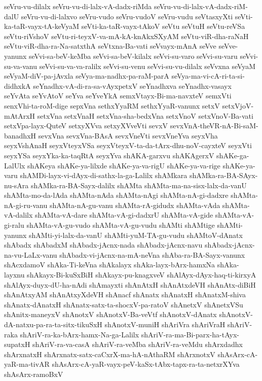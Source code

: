 {seVru-vu-dilalx
seVru-vu-di-lalx-vA-dadx-riMda
seVru-vu-di-lalx-vA-dadx-riM-dalU
seVru-vu-di-lalxvo
seVru-vudo
seVru-vudoV
seVru-vudu
seVtasxyXti
seVti-ka-taR-vayx-tA-keVyaM
seVti-ka-taR-vayx-tAkoV
seVtu
seVtuH
seVtu-reVSa
seVtu-riVshoV
seVtu-ri-teyxV-va-mA-kA-knAkxSXyAM
seVtu-viR-dha-raNaH
seVtu-viR-dha-ra-Na-satxthA
seVtxna-Ba-vati
seVvayx-mAnA
seVve
seVve-yanunx
seVvi-sa-beV-keMba
seVvi-sa-beV-kilalx
seVvi-su-varo
seVvi-su-varu
seVvi-su-va-vanu
seVvi-su-va-va-ralilx
seVvi-su-venu
seVvi-su-vu-dilalx
seVvxna
seVyaM
seVyaM-diV-pa-jAvxla
seVya-ma-nadhx-pa-raM-parA
seVya-ma-vi-cA-ri-ta-si-didhxkA
seYnadhx-vA-di-ra-sa-vAyxpetxV
seYnadhxva
seYnadhx-vasayx
seYvAta
seYvAtoV
seYva
seYveYkA
semxVtayx-Bi-ma-navxteV
semxVti
senxVhi-ta-roM-dige
sepxVna
sethxYyaRM
sethxYyaR-vanunx
setxV
setxVjoV-mAtArxH
setxVna
setxVnaH
setxVna-sha-bedxVna
setxVnoV
setxVnoV-Ba-vati
setxVpa-layx-QuteV
setxyXVva
setxyXVveVti
sevxV
sevxVnA-theVR-nA-Bi-saM-banadhxH
sevxVna
sevxVna-BAsA
sevxVneVti
sevxVneYva
seyxVha
seyxVshAnaH
seyxVteyxVSa
seyxVteyxV-ta-da-tArx-dhu-noV-cayxteV
seyxVti
seyxYSa
seyxYka-ka-taqRtA
seyxYva
shAKA-garxvu
shAKAgerxV
shAKe-ga-LalUlx
shAKeya
shAKe-ya-lilxde
shAKe-ya-va-rigU
shAKe-ya-va-rige
shAKe-ya-varu
shAMDi-layx-vi-dAyx-di-sathx-la-ga-Lalilx
shAMkara
shAMka-ra-BA-SAyx-nu-sAra
shAMka-ra-BA-Sayx-dalilx
shAMta
shAMta-ma-na-sisx-lalx-da-vanU
shAMta-mo-da-lAda
shAMta-nAda
shAMta-nAgi
shAMta-nA-gi-dadxre
shAMta-nA-gi-ru-vanu
shAMta-nA-gu-vanu
shAMta-rA-gidudx
shAMta-vAda
shAMta-vA-dalilx
shAMta-vA-dare
shAMta-vA-gi-dadxrU
shAMta-vA-gide
shAMta-vA-gi-ralu
shAMta-vA-gu-vudo
shAMta-vA-gu-vudu
shAMti
shAMtige
shAMti-yanunx
shAMti-yi-lalx-da-vanU
shAMti-yuM-TA-gu-vudu
shAMtoV-dAnatx
shAbadx
shAbadxM
shAbadx-jAcnx-nada
shAbadx-jAcnx-navu
shAbadx-jAcnx-na-vu-LaLx-vanu
shAbadx-vi-jAcnx-na-mA-neVna
shAba-ra-BA-Sayx-vanunx
shAcxdamoV
shAka-Ti-keVna
shAkalayx
shAka-layx-bArx-hamxNa
shAka-layxnu
shAkayx-Bi-kuSxBiH
shAkayx-pu-knagxveV
shAlAyx-dAyx-haq-ti-kirxyA
shAlAyx-duyx-dU-ha-nAdi
shAmayxti
shAnAtxH
shAnAtxdeVH
shAnAtx-diBiH
shAnAtxyAM
shAnAtxyXdeVH
shAnacf
shAnatx
shAnatxH
shAnatxM-shiva
shAnatx-dAnatxH
shAnatx-satx-ta-shocxV-pa-ratoV
shAnetxV
shAnetxVSu
shAnitx-maneyxV
shAnotxV
shAnotxV-Ba-veVtf
shAnotxV-dAnatx
shAnotxV-dA-natxu-pa-ra-ta-sitx-tikuSxH
shAnotxV-muniH
shAriVra
shAriVraH
shAriV-raka
shAriV-ra-ka-bArx-hamx-Na-ga-Lalilx
shAriV-ra-ma-Bi-parx-ha-tAyx-supatxH
shAriV-ra-va-casA
shAriV-ra-veMba
shAriV-ra-veMdu
shArxdadhx
shArxnatxH
shArxnatx-satx-caCxrX-ma-hA-nAthaRM
shArxnotxV
shAsArx-cA-yaR-ma-tivAR
shAsArx-cA-yaR-vayx-peV-kaSx-tAbx-tapx-ra-ta-netxrXYva
shAsArx-ramoBxV
}
